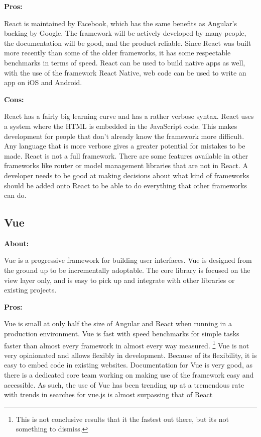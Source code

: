 \documentclass[draftclsnofoot,onecolumn,letterpaper,10pt,compsoc]{IEEEtran}
\begin{document}
    \noindent \textbf{Pros:}

    React is maintained by Facebook, which has the same benefits as Angular's backing by Google.
    The framework will be actively developed by many people, the documentation will be good, and the product reliable.
    Since React was built more recently than some of the older frameworks, it has some respectable benchmarks in terms of speed.\cite{SpeedReport}
    React can be used to build native apps as well, with the use of the framework React Native, web code can be used to write an app on iOS and Android.

    \noindent \textbf{Cons:}

    React has a fairly big learning curve and has a rather verbose syntax.
    React uses a system where the HTML is embedded in the JavaScript code.
    This makes development for people that don't already know the framework more difficult.
    Any language that is more verbose gives a greater potential for mistakes to be made.
    React is not a full framework.
    There are some features available in other frameworks like router or model management libraries that are not in React.
    A developer needs to be good at making decisions about what kind of frameworks should be added onto React to be able to do everything that other frameworks can do.


  \subsection{Vue}

    \textbf{About:}

    Vue is a progressive framework for building user interfaces.
    Vue is designed from the ground up to be incrementally adoptable.
    The core library is focused on the view layer only, and is easy to pick up and integrate with other libraries or existing projects.


    \textbf{Pros:}

    Vue is small at only half the size of Angular and React when running in a production environment.
    Vue is fast with speed benchmarks for simple tasks faster than almost every framework in almost every way measured.
    \footnote{This is not conclusive results that it the fastest out there, but its not something to dismiss.\cite{SpeedReport}}
    Vue is not very opinionated and allows flexibly in development.\cite{Vue}
    Because of its flexibility, it is easy to embed code in existing websites.
    Documentation for Vue is very good, as there is a dedicated core team working on making use of the framework easy and accessible.
    As such, the use of Vue has been trending up at a tremendous rate with trends in searches for vue.js is almost surpassing that of React\cite{vueVSreactSearches}
\end{document}
